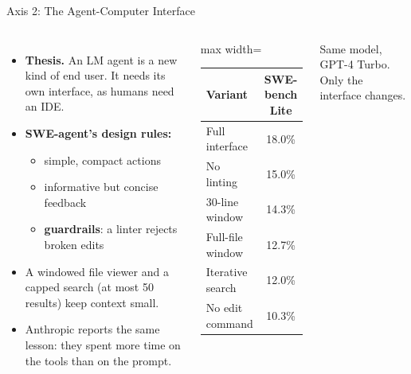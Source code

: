 \begin{frame}{Axis 2: The Agent-Computer Interface}
    \begin{columns}[T,onlytextwidth]
        \begin{itemize}\itemsep0.5em
            \item \textbf{Thesis.} An LM agent is a new kind of end user. It needs its own interface, as humans need an IDE.
            \item \textbf{SWE-agent's design rules:}
            \begin{itemize}\itemsep0.2em
                \item simple, compact actions
                \item informative but concise feedback
                \item \textbf{guardrails}: a linter rejects broken edits
            \end{itemize}
            \item A windowed file viewer and a capped search (at most 50 results) keep context small.
            \item Anthropic reports the same lesson: they spent more time on the tools than on the prompt.
        \end{itemize}
        \centering
        \small
        \begin{adjustbox}{max width=\linewidth}\begin{tabular}{lc}
            \toprule
            \textbf{Variant} & \textbf{SWE-bench Lite} \\
            \midrule
            \rowcolor{KAUSTcyan!12} Full interface & 18.0\% \\
            No linting & 15.0\% \\
            30-line window & 14.3\% \\
            Full-file window & 12.7\% \\
            Iterative search & 12.0\% \\
            No edit command & 10.3\% \\
            \bottomrule
        \end{tabular}\end{adjustbox}

        \vspace{0.5em}
        {\footnotesize Same model, GPT-4 Turbo. Only the interface changes.}
    \end{columns}
    \vspace{0.3em}
\end{frame}

